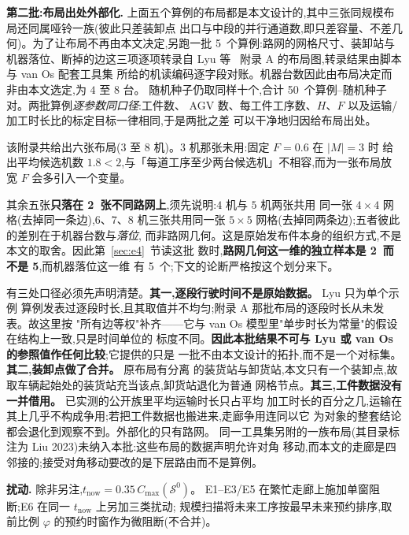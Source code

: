 \documentclass[manuscript,screen,review]{acmart}
\newcommand{\NPubInst}{5}
\newcommand{\NPubPairs}{50}
\newcommand{\NPubNets}{2}
\begin{document}
\textbf{第二批:布局出处外部化.}
上面五个算例的布局都是本文设计的,其中三张同规模布局还同属哑铃一族(彼此只差装卸点
出口与中段的并行通道数,即只差容量、不差几何)。为了让布局不再由本文决定,另跑一批
\NPubInst\ 个算例:路网的网格尺寸、装卸站与机器落位、断掉的边这三项逐项转录自
Lyu 等~\cite{lyu2019approach} 附录 A 的布局图,转录结果由脚本与 van Os 配套工具集
所给的机读编码逐字段对账。机器台数因此由布局决定而非由本文选定,为 \(4\) 至 \(8\) 台。
随机种子仍取同样十个,合计 \NPubPairs\ 个算例--随机种子对。两批算例\emph{逐参数同口径}:工件数、
AGV 数、每工件工序数、\(H\)、\(F\) 以及运输/加工时长比的标定目标一律相同,于是两批之差
可以干净地归因给布局出处。

该附录共给出六张布局(\(3\) 至 \(8\) 机)。\(3\) 机那张未用:固定 \(F=0.6\) 在 \(|M|=3\) 时
给出平均候选机数 \(1.8<2\),与「每道工序至少两台候选机」不相容,而为一张布局放宽 \(F\)
会多引入一个变量。

其余五张\textbf{只落在 \NPubNets\ 张不同路网上},须先说明:\(4\) 机与 \(5\) 机两张共用
同一张 \(4\times 4\) 网格(去掉同一条边),\(6\)、\(7\)、\(8\) 机三张共用同一张
\(5\times 5\) 网格(去掉同两条边);五者彼此的差别在于机器台数与\emph{落位},
而非路网几何。这是原始发布件本身的组织方式,不是本文的取舍。因此第~\ref{sec:e4}~节读这批
数时,\textbf{路网几何这一维的独立样本是 \NPubNets\ 而不是 \NPubInst},而机器落位这一维
有 \NPubInst\ 个;下文的论断严格按这个划分来下。

有三处口径必须先声明清楚。\textbf{其一,逐段行驶时间不是原始数据。} Lyu 只为单个示例
算例发表过逐段时长,且其取值并不均匀;附录 A 那批布局的逐段时长从未发表。故这里按
"所有边等权"补齐——它与 van Os 模型里"单步时长为常量"的假设在结构上一致,只是时间单位的
标度不同。\textbf{因此本批结果不可与 Lyu 或 van Os 的参照值作任何比较};它提供的只是
一批不由本文设计的拓扑,而不是一个对标集。\textbf{其二,装卸点做了合并。} 原布局有分离
的装货站与卸货站,本文只有一个装卸点,故取车辆起始处的装货站充当该点,卸货站退化为普通
网格节点。\textbf{其三,工件数据没有一并借用。} 已实测的公开族里平均运输时长只占平均
加工时长的百分之几,运输在其上几乎不构成争用;若把工件数据也搬进来,走廊争用连同以它
为对象的整套结论都会退化到观察不到。外部化的只有路网。
同一工具集另附的一族布局(其目录标注为 Liu 2023)未纳入本批:这些布局的数据声明允许对角
移动,而本文的走廊是四邻接的;接受对角移动要改的是下层路由而不是算例。

\textbf{扰动.}
除非另注,\(t_{\mathrm{now}}=0.35\,C_{\max}(\mathcal{S}^0)\)。
E1--E3/E5 在繁忙走廊上施加单窗阻断;E6 在同一 \(t_{\mathrm{now}}\) 上另加三类扰动;
规模扫描将未来工序按最早未来预约排序,取前比例 \(\varphi\) 的预约时窗作为微阻断(不合并)。
\end{document}
